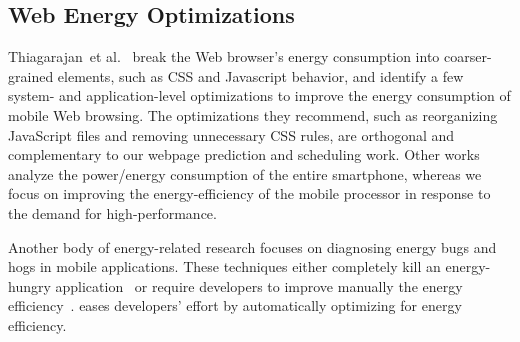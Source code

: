 \subsection{Web Energy Optimizations}
\label{sec:runtime:related:energy}

Thiagarajan~et al.~\cite{www-battery} break the Web browser's energy consumption into coarser-grained elements, such as CSS and Javascript behavior, and identify a few system- and application-level optimizations to improve the energy consumption of mobile Web browsing.  The optimizations they recommend, such as reorganizing JavaScript files and removing unnecessary CSS rules, are orthogonal and complementary to our webpage prediction and scheduling work. Other works analyze the power/energy consumption of the entire smartphone\cite{Carroll,eprof,JamesHotchip}, whereas we focus on improving the energy-efficiency of the mobile processor in response to the demand for high-performance.

Another body of energy-related research focuses on diagnosing energy bugs and hogs in mobile applications. These techniques either completely kill an energy-hungry application~\cite{carat} or require developers to improve manually the energy efficiency~\cite{energygreedapis,eprof,eLens}. \webrt eases developers' effort by automatically optimizing for energy efficiency.

